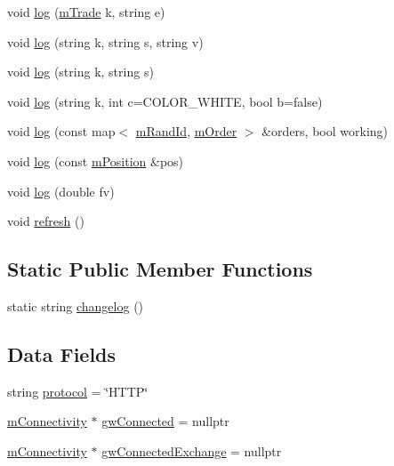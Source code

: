 \begin{DoxyCompactItemize}
\item 
void \hyperlink{class_k_1_1_s_h_a50fa1ebfccaac1a37b97b499780a4d30}{log} (\hyperlink{struct_k_1_1m_trade}{m\+Trade} k, string e)
\item 
void \hyperlink{class_k_1_1_s_h_a05d165fd99c6a9407040879a506bcf94}{log} (string k, string s, string v)
\item 
void \hyperlink{class_k_1_1_s_h_ac768cf60d7151187490fb98888116fbf}{log} (string k, string s)
\item 
void \hyperlink{class_k_1_1_s_h_a81f63afb8bf5d2129520b9d83a8aae45}{log} (string k, int c=C\+O\+L\+O\+R\+\_\+\+W\+H\+I\+TE, bool b=false)
\item 
void \hyperlink{class_k_1_1_s_h_a56dbc67f7f81955c835dee9802bc6d90}{log} (const map$<$ \hyperlink{km_8h_a23233b27e494114073abc4d494b05626}{m\+Rand\+Id}, \hyperlink{struct_k_1_1m_order}{m\+Order} $>$ \&orders, bool working)
\item 
void \hyperlink{class_k_1_1_s_h_a5be6e66b940b986413db423ab7df1cd2}{log} (const \hyperlink{struct_k_1_1m_position}{m\+Position} \&pos)
\item 
void \hyperlink{class_k_1_1_s_h_ac7b5f65dd2a0c700f7ab8c39ff6c5963}{log} (double fv)
\item 
void \hyperlink{class_k_1_1_s_h_a5f2e190b8261a98c97c2ea4e86670d54}{refresh} ()
\end{DoxyCompactItemize}
\subsection*{Static Public Member Functions}
\begin{DoxyCompactItemize}
\item 
static string \hyperlink{class_k_1_1_s_h_abb2930f405f8983fca3bab0e1d505a85}{changelog} ()
\end{DoxyCompactItemize}
\subsection*{Data Fields}
\begin{DoxyCompactItemize}
\item 
string \hyperlink{class_k_1_1_s_h_aeb72b6e20d3a581dcdede91beb824d9f}{protocol} = \char`\"{}H\+T\+TP\char`\"{}
\item 
\hyperlink{namespace_k_a3da250819294c55d5728586148bfa19e}{m\+Connectivity} $\ast$ \hyperlink{class_k_1_1_s_h_a572945fdb3d861b6c685f6c5af9f1376}{gw\+Connected} = nullptr
\item 
\hyperlink{namespace_k_a3da250819294c55d5728586148bfa19e}{m\+Connectivity} $\ast$ \hyperlink{class_k_1_1_s_h_a6d9ed4a9793ac810eca371568ee912d3}{gw\+Connected\+Exchange} = nullptr
\end{DoxyCompactItemize}


